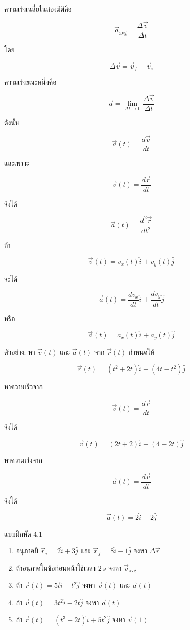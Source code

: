 ความเร่งเฉลี่ยในสองมิติคือ

\[
\vec{a}_{\text{avg}}=\frac{\Delta \vec{v}}{\Delta t}
\]

โดย

\[
\Delta \vec{v}=\vec{v}_f-\vec{v}_i
\]

ความเร่งขณะหนึ่งคือ

\[
\vec{a}
=
\lim_{\Delta t\to 0}
\frac{\Delta \vec{v}}{\Delta t}
\]

ดังนั้น

\[
\vec{a}(t)=\frac{d\vec{v}}{dt}
\]

และเพราะ

\[
\vec{v}(t)=\frac{d\vec{r}}{dt}
\]

จึงได้

\[
\vec{a}(t)=\frac{d^2\vec{r}}{dt^2}
\]

ถ้า

\[
\vec{v}(t)=v_x(t)\hat{i}+v_y(t)\hat{j}
\]

จะได้

\[
\vec{a}(t)=\frac{dv_x}{dt}\hat{i}+\frac{dv_y}{dt}\hat{j}
\]

หรือ

\[
\vec{a}(t)=a_x(t)\hat{i}+a_y(t)\hat{j}
\]

\begin{examplebox}{ตัวอย่าง: หา $\vec{v}(t)$ และ $\vec{a}(t)$ จาก $\vec{r}(t)$}
กำหนดให้

\[
\vec{r}(t)=(t^2+2t)\hat{i}+(4t-t^2)\hat{j}
\]

หาความเร็วจาก

\[
\vec{v}(t)=\frac{d\vec{r}}{dt}
\]

จึงได้

\[
\vec{v}(t)=(2t+2)\hat{i}+(4-2t)\hat{j}
\]

หาความเร่งจาก

\[
\vec{a}(t)=\frac{d\vec{v}}{dt}
\]

จึงได้

\[
\vec{a}(t)=2\hat{i}-2\hat{j}
\]
\end{examplebox}

\begin{exercisebox}{แบบฝึกหัด 4.1}
\begin{enumerate}
    \item อนุภาคมี $\vec{r}_i=2\hat{i}+3\hat{j}$ และ $\vec{r}_f=8\hat{i}-1\hat{j}$ จงหา $\Delta \vec{r}$
    \item ถ้าอนุภาคในข้อก่อนหน้าใช้เวลา $2\,\si{s}$ จงหา $\vec{v}_{\text{avg}}$
    \item ถ้า $\vec{r}(t)=5t\hat{i}+t^2\hat{j}$ จงหา $\vec{v}(t)$ และ $\vec{a}(t)$
    \item ถ้า $\vec{v}(t)=3t^2\hat{i}-2t\hat{j}$ จงหา $\vec{a}(t)$
    \item ถ้า $\vec{r}(t)=(t^3-2t)\hat{i}+5t^2\hat{j}$ จงหา $\vec{v}(1)$
\end{enumerate}
\end{exercisebox}

